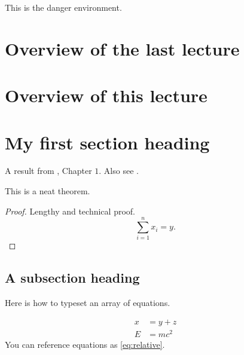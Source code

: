 \documentclass[12pt]{report}
\begin{document}

\maketitle



\begin{danger}
This is the danger environment.
\end{danger}

\section{Overview of the last lecture}

\section{Overview of this lecture}

\section{My first section heading}


A result from \cite{Hartline2013}, Chapter $1$. Also see \cite{Nisan2007}.

\begin{theorem}

\label{ThmNeat}
This is a neat theorem.
\end{theorem}

\begin{proof}
Lengthy and technical proof.
\begin{equation*}
\sum_{i=1}^n x_i = y.
\end{equation*}
\end{proof}



\subsection{A subsection heading}


Here is how to typeset an array of equations.

\begin{align}
	x & = y + z \nonumber \\
     E & = mc^2 \label{eq:relative}
\end{align}
You can reference equations as \cref{eq:relative}.
\end{document}
